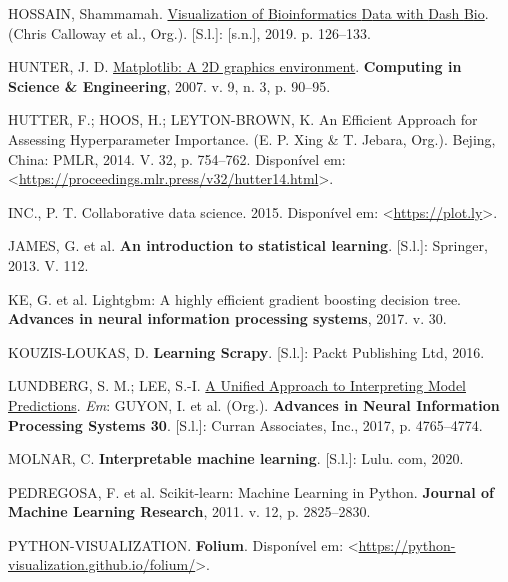 \documentclass[
  12pt,
  a4paper,
]{scrreprt}
\newlength{\cslhangindent}
\newenvironment{CSLReferences}[2] %
 {\begin{list}{}{%
  \setlength{\itemindent}{0pt}
  \setlength{\leftmargin}{0pt}
  \setlength{\parsep}{0pt}
  \ifodd #1
   \setlength{\leftmargin}{\cslhangindent}
   \setlength{\itemindent}{-1\cslhangindent}
  \fi
  \setlength{\itemsep}{#2\baselineskip}}}
 {\end{list}}
\begin{document}
\begin{CSLReferences}{0}{1}
HOSSAIN, Shammamah.
\href{https://doi.org/10.25080/Majora-7ddc1dd1-012}{{V}isualization of
{B}ioinformatics {D}ata with {D}ash {B}io}. (Chris Calloway et al.,
Org.). {[}S.l.{]}: {[}s.n.{]}, 2019. p. 126--133.

HUNTER, J. D. \href{https://doi.org/10.1109/MCSE.2007.55}{Matplotlib: A
2D graphics environment}. \textbf{Computing in Science \& Engineering},
2007. v. 9, n. 3, p. 90--95.

HUTTER, F.; HOOS, H.; LEYTON-BROWN, K. An Efficient Approach for
Assessing Hyperparameter Importance. (E. P. Xing \& T. Jebara, Org.).
Bejing, China: PMLR, 2014. V. 32, p. 754--762. Disponível em:
\textless{}\url{https://proceedings.mlr.press/v32/hutter14.html}\textgreater.

INC., P. T. Collaborative data science. 2015. Disponível em:
\textless{}\url{https://plot.ly}\textgreater.

JAMES, G. et al. \textbf{An introduction to statistical learning}.
{[}S.l.{]}: Springer, 2013. V. 112.

KE, G. et al. Lightgbm: A highly efficient gradient boosting decision
tree. \textbf{Advances in neural information processing systems}, 2017.
v. 30.

KOUZIS-LOUKAS, D. \textbf{Learning Scrapy}. {[}S.l.{]}: Packt Publishing
Ltd, 2016.

LUNDBERG, S. M.; LEE, S.-I.
\href{http://papers.nips.cc/paper/7062-a-unified-approach-to-interpreting-model-predictions.pdf}{A
Unified Approach to Interpreting Model Predictions}. \emph{Em}: GUYON,
I. et al. (Org.). \textbf{Advances in Neural Information Processing
Systems 30}. {[}S.l.{]}: Curran Associates, Inc., 2017, p. 4765--4774.

MOLNAR, C. \textbf{Interpretable machine learning}. {[}S.l.{]}: Lulu.
com, 2020.

PEDREGOSA, F. et al. Scikit-learn: Machine Learning in {P}ython.
\textbf{Journal of Machine Learning Research}, 2011. v. 12, p.
2825--2830.

PYTHON-VISUALIZATION. \textbf{Folium}. Disponível em:
\textless{}\url{https://python-visualization.github.io/folium/}\textgreater.


\end{CSLReferences}
\end{document}
